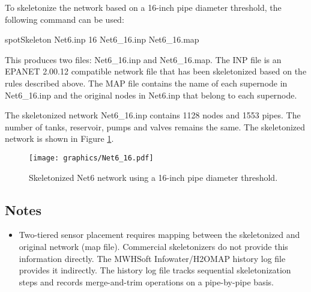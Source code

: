 To skeletonize the network based on a 16-inch pipe diameter threshold, the following command can be used:
\begin{unknownListing}
   spotSkeleton Net6.inp 16 Net6_16.inp Net6_16.map
\end{unknownListing}

This produces two files: Net6\_16.inp and Net6\_16.map. The INP file is an EPANET 2.00.12 
compatible network file that has been skeletonized based on the rules described above.
The MAP file contains the name of each supernode in Net6\_16.inp and the original 
nodes in Net6.inp that belong to each supernode.  

The skeletonized network Net6\_16.inp contains 
1128 nodes and 1553 pipes. The number of tanks, reservoir, pumps and valves remains the same. 
The skeletonized network is shown in Figure \ref{fig:skelExecutable-skelNetwork}. 
\begin{figure}[h]
  \centering
  \texttt{[image: graphics/Net6\_16.pdf]}
  \caption{Skeletonized Net6 network using a 16-inch pipe diameter threshold.}
  \label{fig:skelExecutable-skelNetwork}
\end{figure}

\subsection{Notes}\label{skelExecutable_picoNotes}
\begin{itemize}
\item Two-tiered sensor placement requires mapping 
between the skeletonized and original network (map file). Commercial skeletonizers 
do not provide this information directly. The MWHSoft Infowater/H2OMAP history 
log file provides it indirectly. The history log file 
tracks sequential skeletonization steps and records merge-\/and-\/trim operations on a 
pipe-by-pipe basis.    
\end{itemize} 
\fi
